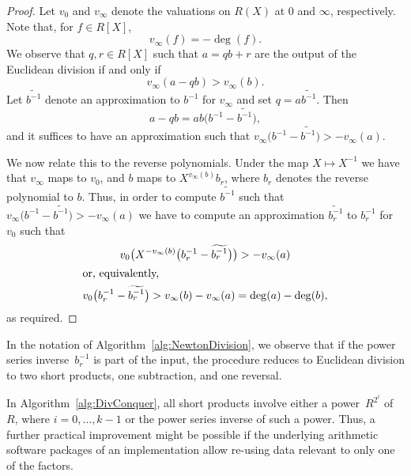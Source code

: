 \begin{proof}
Let $v_0$ and $v_{\infty}$ denote the valuations on $R(X)$ at 
$0$ and $\infty$, respectively.  Note that, for $f \in R[X]$, 
\begin{equation}
v_{\infty}(f) = - \deg(f).
\end{equation}
We observe that $q, r \in R[X]$ such that $a = qb + r$ are 
the output of the Euclidean division if and only if 
\begin{equation}
v_{\infty} (a - qb) > v_{\infty} (b).
\end{equation}
Let $\widetilde{b^{-1}}$ denote an approximation to $b^{-1}$ 
for $v_{\infty}$ and set $q = a \widetilde{b^{-1}}$.  Then 
\begin{equation}
a - qb = ab \bigl(b^{-1} - \widetilde{b^{-1}}\bigr),
\end{equation}
and it suffices to have an approximation such that 
\mbox{$v_{\infty} \bigl( b^{-1} - \widetilde{b^{-1}} \bigr) > - v_{\infty}(a)$}.

We now relate this to the reverse polynomials.  Under the map 
$X \mapsto X^{-1}$ we have that $v_{\infty}$ maps to $v_0$, 
and $b$ maps to $X^{v_{\infty}(b)} b_r$, where $b_r$ denotes 
the reverse polynomial to $b$.  Thus, in order to compute 
$\widetilde{b^{-1}}$ such that 
\mbox{$v_{\infty} \bigl( b^{-1} - \widetilde{b^{-1}} \bigr) > - v_{\infty}(a)$} 
we have to compute an approximation $\widetilde{b_r^{-1}}$ to 
$b_r^{-1}$ for $v_0$ such that 
\begin{gather}
v_0 \bigl( X^{-v_{\infty}(b)} \bigl(b_r^{-1} - \widetilde{b_r^{-1}} \bigr) \bigr) > - v_{\infty} (a) \\
\intertext{or, equivalently, }
v_0 \bigl(b_r^{-1} - \widetilde{b_r^{-1}}\bigr) > v_{\infty}(b) - v_{\infty}(a) = \deg(a) - \deg(b), 
\end{gather}
as required.
\end{proof}

\begin{rem}
In the notation of Algorithm~\ref{alg:NewtonDivision}, we observe 
that if the power series inverse~$b_r^{-1}$ is part of the input, 
the procedure reduces to Euclidean division to two short products, 
one subtraction, and one reversal.
\end{rem}

\begin{rem}
In Algorithm~\ref{alg:DivConquer}, all short products involve either 
a power~$R^{2^i}$ of $R$, where $i = 0, \dotsc, k-1$ or the power series 
inverse of such a power.  Thus, a further practical improvement might 
be possible if the underlying arithmetic software packages of an 
implementation allow re-using data relevant to only one of the factors.
\end{rem}

